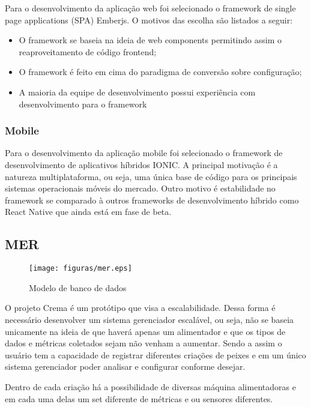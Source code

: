 Para o desenvolvimento da aplicação web foi selecionado o framework de single page applications (SPA) Emberjs. O motivos das escolha são listados a seguir:

\begin{itemize}
  \item O framework se baseia na ideia de web components permitindo assim  o reaproveitamento de código frontend;
  \item O framework é feito em cima do paradigma de conversão sobre configuração;
  \item A maioria da equipe de desenvolvimento possui experiência com desenvolvimento para o framework
\end{itemize}

\subsubsection{Mobile}

Para o desenvolvimento da aplicação mobile foi selecionado o framework de desenvolvimento de aplicativos híbridos IONIC. A principal motivação é a natureza multiplataforma, ou seja, uma única base de código para os principais sistemas operacionais móveis do mercado. Outro motivo é estabilidade no framework se comparado à outros frameworks de desenvolvimento híbrido como React Native que ainda está em fase de beta.

\subsection{MER}

\begin{figure}[H]
 \centering
   \texttt{[image: figuras/mer.eps]}
 \caption{Modelo de banco de dados}
 \label{mer}
\end{figure}

O projeto Crema é um protótipo que visa a escalabilidade. Dessa forma é necessário desenvolver um sistema gerenciador escalável, ou seja, não se baseia unicamente na ideia de que haverá apenas um alimentador e que os tipos de dados e métricas coletados sejam não venham a aumentar. Sendo a assim o usuário tem a capacidade de registrar diferentes criações de peixes e em um único sistema gerenciador poder analisar e configurar conforme desejar.

Dentro de cada criação há a possibilidade de diversas máquina alimentadoras e em cada uma delas um set diferente de métricas e ou sensores diferentes.

